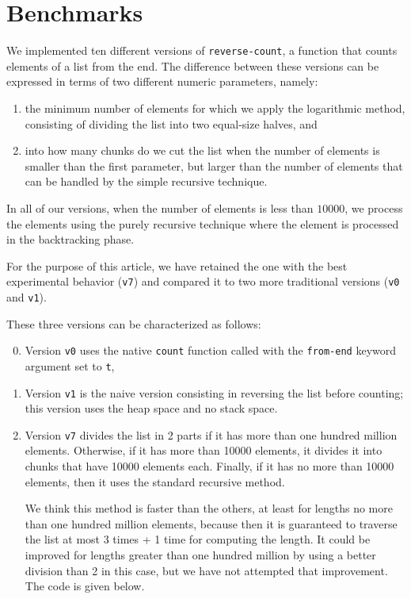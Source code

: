 \section{Benchmarks}
\label{sec-benchmarks}

We implemented ten different versions of \texttt{reverse-count}, a
function that counts elements of a list from the end.  The difference
between these versions can be expressed in terms of two different
numeric parameters, namely:

\begin{enumerate}
\item the minimum number of elements for which we apply the
  logarithmic method, consisting of dividing the list into two
  equal-size halves, and
\item into how many chunks do we cut the list when the number of
  elements is smaller than the first parameter, but larger than the
  number of elements that can be handled by the simple recursive
  technique.
\end{enumerate}

In all of our versions, when the number of elements is less than
$10000$, we process the elements using the purely recursive technique
where the element is processed in the backtracking phase.

For the purpose of this article,
we have retained the one with the best experimental behavior (\texttt{v7})
and compared it to two more traditional versions  (\texttt{v0} and \texttt{v1}).

These three versions can be characterized as follows:

\begin{enumerate}
\setcounter{enumi}{-1}
\item Version \texttt{v0} uses the native \texttt{count} function
  called with the \texttt{from-end} keyword argument set to
  \texttt{t},
\item Version \texttt{v1} is the naive version consisting in reversing the list 
before counting; this version uses the heap space and no stack space.
\setcounter{enumi}{6}
\item Version \texttt{v7} divides the list in 2 parts
if it has more than one 
hundred million elements.  Otherwise, if it has more than 10000
elements, it divides it into chunks that have 10000 elements each.
Finally, if it has no more than 10000 elements, then it uses the
standard recursive method.

We think this method is faster than the others, at least for
lengths no more than one hundred million elements, because then it
is guaranteed to traverse the list at most 3 times + 1 time for
computing the length.  It could be improved for lengths greater
than one hundred million by using a better division than 2 in this
case, but we have not attempted that improvement.
The code is given below.
\end{enumerate}

